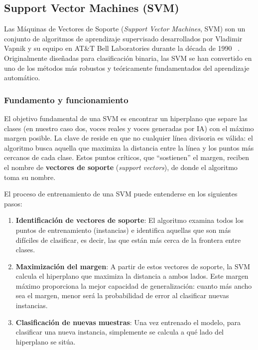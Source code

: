 \subsection{Support Vector Machines (SVM)}
\label{subsubsec:eda_svm}

Las Máquinas de Vectores de Soporte (\textit{Support Vector Machines}, SVM) son un conjunto de algoritmos de aprendizaje supervisado desarrollados por Vladimir Vapnik y su equipo en AT\&T Bell Laboratories durante la década de 1990 ~\parencite{1995svm}. Originalmente diseñadas para clasificación binaria, las SVM se han convertido en uno de los métodos más robustos y teóricamente fundamentados del aprendizaje automático.

\subsubsection*{Fundamento y funcionamiento}

El objetivo fundamental de una SVM es encontrar un hiperplano que separe las clases (en nuestro caso dos, voces reales y voces generadas por IA) con el máximo margen posible. La clave de reside en que no cualquier línea divisoria es válida: el algoritmo busca aquella que maximiza la distancia entre la línea y los puntos más cercanos de cada clase. Estos puntos críticos, que ``sostienen'' el margen, reciben el nombre de \textbf{vectores de soporte} (\textit{support vectors}), de donde el algoritmo toma su nombre.

El proceso de entrenamiento de una SVM puede entenderse en los siguientes pasos:

\begin{enumerate}
    \item \textbf{Identificación de vectores de soporte}: El algoritmo examina todos los puntos de entrenamiento (instancias) e identifica aquellas que son más difíciles de clasificar, es decir, las que están más cerca de la frontera entre clases.
    
    \item \textbf{Maximización del margen}: A partir de estos vectores de soporte, la SVM calcula el hiperplano que maximiza la distancia a ambos lados. Este margen máximo proporciona la mejor capacidad de generalización: cuanto más ancho sea el margen, menor será la probabilidad de error al clasificar nuevas instancias.
    
    \item \textbf{Clasificación de nuevas muestras}: Una vez entrenado el modelo, para clasificar una nueva instancia, simplemente se calcula a qué lado del hiperplano se sitúa.
\end{enumerate}

